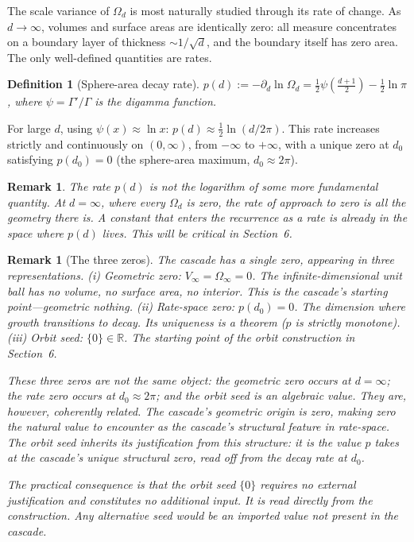 \documentclass[11pt,a4paper]{article}
\newtheorem{definition}[theorem]{Definition}
\newtheorem{remark}[theorem]{Remark}
\begin{document}
The scale variance of $\Omega_d$ is most naturally studied through its rate of change. As $d\to\infty$,
volumes and surface areas are identically zero: all measure concentrates on a boundary
layer of thickness $\sim 1/\sqrt{d}$, and the boundary itself has zero area. The only well-defined
quantities are rates.

\begin{definition}[Sphere-area decay rate]
$p(d) := -\partial_d\ln\Omega_d = \frac{1}{2}\psi\!\left(\frac{d+1}{2}\right) - \frac{1}{2}\ln\pi$,
where $\psi = \Gamma'/\Gamma$ is the digamma function.
\end{definition}

For large $d$, using $\psi(x) \approx \ln x$: $p(d) \approx \frac{1}{2}\ln(d/2\pi)$. This rate increases strictly and
continuously on $(0,\infty)$, from $-\infty$ to $+\infty$, with a unique zero at $d_0$ satisfying $p(d_0) = 0$
(the sphere-area maximum, $d_0 \approx 2\pi$).

\begin{remark}
The rate $p(d)$ is not the logarithm of some more fundamental quantity. At
$d=\infty$, where every $\Omega_d$ is zero, the rate of approach to zero is all the geometry there is. A
constant that enters the recurrence as a rate is already in the space where $p(d)$ lives. This
will be critical in Section~6.
\end{remark}

\begin{remark}[The three zeros]
The cascade has a single zero, appearing in three representations. (i) Geometric zero: $V_\infty = \Omega_\infty = 0$. The infinite-dimensional unit ball has
no volume, no surface area, no interior. This is the cascade's starting point---geometric
nothing. (ii) Rate-space zero: $p(d_0) = 0$. The dimension where growth transitions to
decay. Its uniqueness is a theorem ($p$ is strictly monotone). (iii) Orbit seed: $\{0\} \in \mathbb{R}$.
The starting point of the orbit construction in Section~6.

These three zeros are not the same object: the geometric zero occurs at $d=\infty$; the
rate zero occurs at $d_0 \approx 2\pi$; and the orbit seed is an algebraic value. They are, however,
coherently related. The cascade's geometric origin is zero, making zero the natural value
to encounter as the cascade's structural feature in rate-space. The orbit seed inherits its
justification from this structure: it is the value $p$ takes at the cascade's unique structural
zero, read off from the decay rate at $d_0$.

The practical consequence is that the orbit seed $\{0\}$ requires no external justification and
constitutes no additional input. It is read directly from the construction. Any alternative
seed would be an imported value not present in the cascade.
\end{remark}
\end{document}
